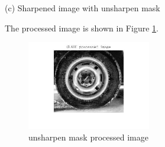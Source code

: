 (c) Sharpened image with unsharpen mask

The processed image is shown in Figure \ref{fig:p2c}.







\begin{figure}[htbp]
    \centering
	\includegraphics[width=0.48\textwidth]{../images/p1/p1c_image.jpg}
    \caption{unsharpen mask processed image}
\label{fig:p2c}
\end{figure}

\newpage
